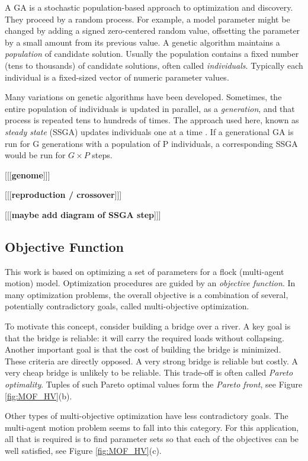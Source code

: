 \documentclass[letterpaper]{article}
\begin{document}
A GA is a stochastic population-based approach to optimization and discovery. They proceed by a random process. For example, a model parameter might be changed by adding a signed zero-centered random value, offsetting the parameter by a small amount from its previous value. A genetic algorithm maintains a \textit{population} of candidate solution. Usually the population contains a fixed number (tens to thousands) of candidate solutions, often called \textit{individuals}. Typically each individual is a fixed-sized vector of numeric parameter values.

Many variations on genetic algorithms have been developed. Sometimes, the entire population of individuals is updated in parallel, as a \textit{generation}, and that process is repeated tens to hundreds of times. The approach used here, known as \textit{steady state} (SSGA) updates individuals one at a time \citep{syswerda_study_1991}. If a generational GA is run for G generations with a population of P individuals, a corresponding SSGA would be run for $G \times P$ steps.

[[[\textbf{genome}]]]

[[[\textbf{reproduction / crossover}]]]

[[[\textbf{maybe add diagram of SSGA step}]]]

\subsection{Objective Function}
\label{subsec:Objective_Function}

This work is based on optimizing a set of parameters for a flock (multi-agent motion) model. Optimization procedures are guided by an \textit{objective function}. In many optimization problems, the overall objective is a combination of several, potentially contradictory goals, called multi-objective optimization. 

To motivate this concept, consider building a bridge over a river. A key goal is that the bridge is reliable: it will carry the required loads without collapsing. Another important goal is that the cost of building the bridge is minimized. These criteria are directly opposed. A very strong bridge is reliable but costly. A very cheap bridge is unlikely to be reliable. This trade-off is often called \textit{Pareto optimality}. Tuples of such Pareto optimal values form the \textit{Pareto front}, see Figure \ref{fig:MOF_HV}(b).

Other types of multi-objective optimization have less contradictory goals. The multi-agent motion problem seems to fall into this category. For this application, all that is required is to find parameter sets so that each of the objectives can be well satisfied, see Figure \ref{fig:MOF_HV}(c).
\end{document}
